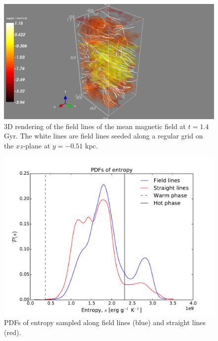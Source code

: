 \documentclass[useAMS,usenatbib]{mn2e}
\begin{document}
\begin{figure}
  \vspace{0cm}
  \centering
  \hspace*{0cm} \includegraphics[scale=0.35]{fig/snapshot1.png}
  \hspace*{0cm} \caption{3D rendering of the field lines of the mean magnetic field at $t = 1.4$ Gyr. The white lines are field lines seeded along a regular grid on the $xz$-plane at $y=-0.51$ kpc. 
  \label{fig:fld_lines}}
\end{figure}
\begin{figure}
  \centering 
  \includegraphics[width=\linewidth]{snapshot0_entropy.pdf}
  \caption{PDFs of entropy sampled along field lines (blue) and straight lines (red).}
  \label{fig:pdfs_mean}
\end{figure} 
\end{document}
